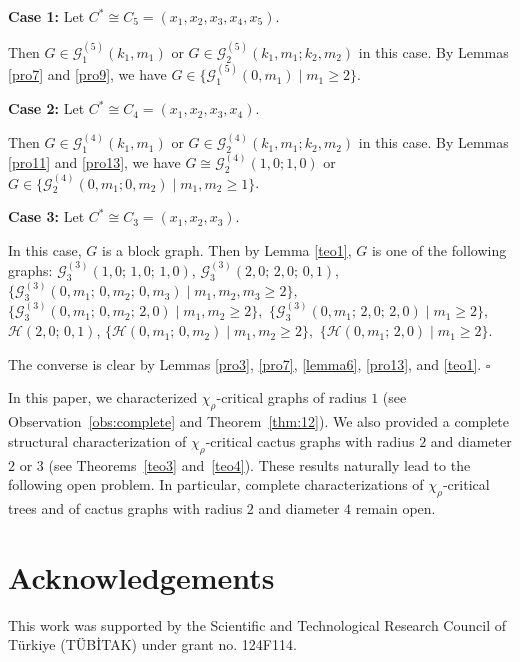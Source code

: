 \documentclass[12pt]{article}
\newcommand{\qed}{\hfill $\square$ \bigskip}
\begin{document}
\textbf{Case 1:} Let \( C^* \cong C_5=(x_1, x_2, x_3, x_4, x_5) \).

Then $G \in \mathcal{G}_{1}^{(5)}(k_1,m_1)$ or $G \in \mathcal{G}_{2}^{(5)}(k_{1},m_{1};k_{2},m_{2})$ in this case. By Lemmas \ref{pro7} and  \ref{pro9}, we have $G \in \{\mathcal{G}_{1}^{(5)}(0,m_1) \mid m_1 \ge 2\}$.
	
\textbf{Case 2:} Let \( C^* \cong C_4=(x_1, x_2, x_3, x_4) \).

Then $G \in \mathcal{G}_{1}^{(4)}(k_1,m_1)$ or $G \in \mathcal{G}_{2}^{(4)}(k_{1},m_{1};k_{2},m_{2})$ in this case. By Lemmas \ref{pro11} and  \ref{pro13}, we have $G \cong \mathcal{G}_{2}^{(4)}(1,0;1,0)$ or  $G \in \{\mathcal{G}_{2}^{(4)}(0,m_1;0,m_2) \mid m_1, m_2 \ge 1\}$.
	
\textbf{Case 3:} Let \( C^* \cong C_3=(x_1, x_2, x_3) \). 

In this case,  $G$ is a block graph. Then by Lemma \ref{teo1}, $G$ is one of the following graphs: $\mathcal{G}_{3}^{(3)}(1,0;\,1,0;\,1,0)$, $\mathcal{G}_{3}^{(3)}(2,0;\,2,0;\,0,1)$,
$\{\mathcal{G}_{3}^{(3)}(0,m_{1};\,0,m_{2};\,0,m_{3}) \mid m_{1},m_{2},m_{3} \ge 2\},$
$\{\mathcal{G}_{3}^{(3)}(0,m_{1};\,0,m_{2};\,2,0) \mid m_{1},m_{2} \ge 2\},$
$\{\mathcal{G}_{3}^{(3)}(0,m_{1};\,2,0;\,2,0) \mid m_{1} \ge 2\},$
$\mathcal{H}(2,0;\,0,1)$,
$\{\mathcal{H}(0,m_{1};\,0,m_{2}) \mid m_{1},m_{2} \ge 2\},$
$\{\mathcal{H}(0,m_{1};\,2,0) \mid m_{1} \ge 2\}.$
	
The converse is clear by Lemmas \ref{pro3}, \ref{pro7}, \ref{lemma6}, \ref{pro13}, and \ref{teo1}.
\qed

In this paper, we characterized $\chi_\rho$-critical graphs of radius $1$ (see Observation~\ref{obs:complete} and Theorem~\ref{thm:12}). We also provided a complete structural characterization of $\chi_\rho$-critical cactus graphs with radius $2$ and diameter $2$ or $3$ (see Theorems~\ref{teo3} and~\ref{teo4}).
These results naturally lead to the following open problem. In particular, complete characterizations of $\chi_\rho$-critical trees and of cactus graphs with radius $2$ and diameter $4$ remain open.

\section*{Acknowledgements}

This work was supported by the Scientific and Technological Research Council of Türkiye (TÜBİTAK) under grant no. 124F114.
\end{document}
